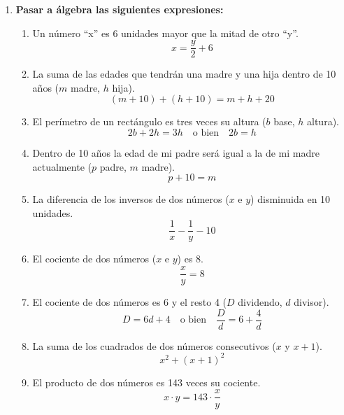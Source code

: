 \documentclass[a4paper,12pt]{article}
\begin{document}
\begin{enumerate}
\begin{enumerate}[label=\textbf{\alph*)}]
            \vspace{0.3cm}
            
            \item $\dfrac{x^2 - 1}{x^2 - 2x + 1} = \dfrac{(x - 1)(x + 1)}{(x - 1)^2} = \dfrac{x + 1}{x - 1}$
        \end{enumerate}

    \vspace{0.5cm}

    \item \textbf{Pasar a álgebra las siguientes expresiones:}
        \begin{enumerate}[label=\textbf{\alph*)}]
            \item Un número “x” es 6 unidades mayor que la mitad de otro “y”.
            \[
            x = \frac{y}{2} + 6
            \]

            \item La suma de las edades que tendrán una madre y una hija dentro de 10 años ($m$ madre, $h$ hija).
            \[
            (m + 10) + (h + 10) = m + h + 20
            \]

            \item El perímetro de un rectángulo es tres veces su altura ($b$ base, $h$ altura).
            \[
            2b + 2h = 3h \quad \text{o bien} \quad 2b = h
            \]

            \item Dentro de 10 años la edad de mi padre será igual a la de mi madre actualmente ($p$ padre, $m$ madre).
            \[
            p + 10 = m
            \]

            \item La diferencia de los inversos de dos números ($x$ e $y$) disminuida en 10 unidades.
            \[
            \frac{1}{x} - \frac{1}{y} - 10
            \]

            \item El cociente de dos números ($x$ e $y$) es 8.
            \[
            \frac{x}{y} = 8
            \]

            \item El cociente de dos números es 6 y el resto 4 ($D$ dividendo, $d$ divisor).
            \[
            D = 6d + 4 \quad \text{o bien} \quad \frac{D}{d} = 6 + \frac{4}{d}
            \]

            \item La suma de los cuadrados de dos números consecutivos ($x$ y $x+1$).
            \[
            x^2 + (x + 1)^2
            \]

            \item El producto de dos números es 143 veces su cociente.
            \[
            x \cdot y = 143 \cdot \frac{x}{y}
            \]
        \end{enumerate}

\end{enumerate}
\end{document}
